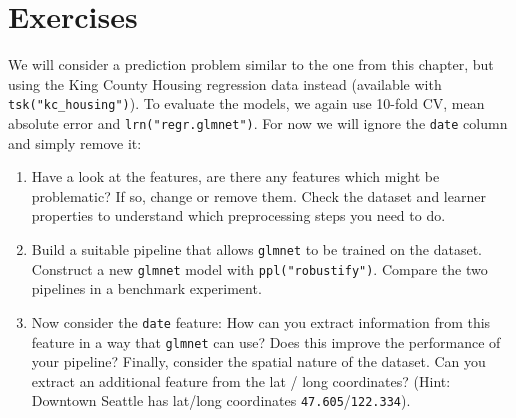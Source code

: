 \hypertarget{exercises-7}{%
\section{Exercises}\label{exercises-7}}

We will consider a prediction problem similar to the one from this
chapter, but using the King County Housing regression data instead
(available with \texttt{tsk("kc\_housing")}). To evaluate the models, we
again use 10-fold CV, mean absolute error and
\texttt{lrn("regr.glmnet")}. For now we will ignore the \texttt{date}
column and simply remove it:

\begin{Shaded}
\begin{Highlighting}[]
\NormalTok{(}\NormalTok{)}
\OtherTok{=} \NormalTok{(}\NormalTok{)}
\SpecialCharTok{$}\NormalTok{(}\SpecialCharTok{$}\NormalTok{))}
\end{Highlighting}
\end{Shaded}

\begin{enumerate}
\def\labelenumi{\arabic{enumi}.}
\tightlist
\item
  Have a look at the features, are there any features which might be
  problematic? If so, change or remove them. Check the dataset and
  learner properties to understand which preprocessing steps you need to
  do.
\item
  Build a suitable pipeline that allows \texttt{glmnet} to be trained on
  the dataset. Construct a new \texttt{glmnet} model with
  \texttt{ppl("robustify")}. Compare the two pipelines in a benchmark
  experiment.
\item
  Now consider the \texttt{date} feature: How can you extract
  information from this feature in a way that \texttt{glmnet} can use?
  Does this improve the performance of your pipeline? Finally, consider
  the spatial nature of the dataset. Can you extract an additional
  feature from the lat / long coordinates? (Hint: Downtown Seattle has
  lat/long coordinates \texttt{47.605}/\texttt{122.334}).
\end{enumerate}
